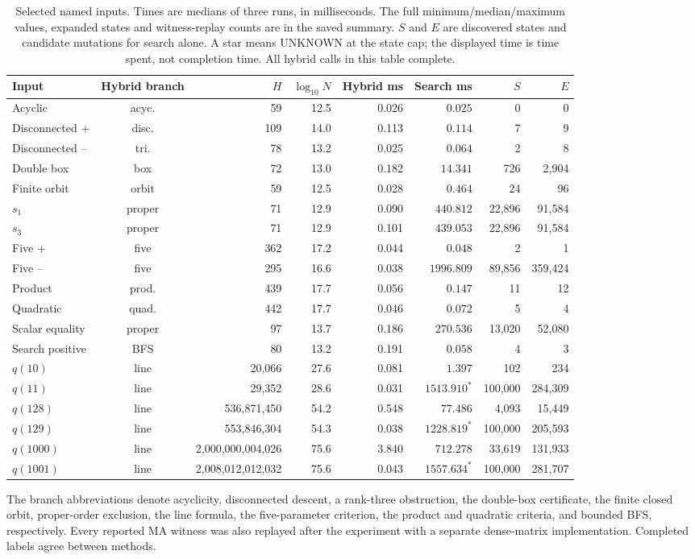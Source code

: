 \begin{table}[htbp]\centering\scriptsize
\caption{Selected named inputs. Times are medians of three runs, in milliseconds. The full minimum/median/maximum values, expanded states and witness-replay counts are in the saved summary. $S$ and $E$ are discovered states and candidate mutations for search alone. A star means UNKNOWN at the state cap; the displayed time is time spent, not completion time. All hybrid calls in this table complete.}\label{tab:named}
\begin{tabular}{@{}lcrrrrrr@{}}\toprule
Input & Hybrid branch & $H$ & $\log_{10}N$ & Hybrid ms & Search ms & $S$ & $E$\\\midrule
Acyclic & acyc. & 59 & 12.5 & 0.026 & $0.025$ & 0 & 0 \\
Disconnected + & disc. & 109 & 14.0 & 0.113 & $0.114$ & 7 & 9 \\
Disconnected -- & tri. & 78 & 13.2 & 0.025 & $0.064$ & 2 & 8 \\
Double box & box & 72 & 13.0 & 0.182 & $14.341$ & 726 & 2,904 \\
Finite orbit & orbit & 59 & 12.5 & 0.028 & $0.464$ & 24 & 96 \\
$s_1$ & proper & 71 & 12.9 & 0.090 & $440.812$ & 22,896 & 91,584 \\
$s_3$ & proper & 71 & 12.9 & 0.101 & $439.053$ & 22,896 & 91,584 \\
Five + & five & 362 & 17.2 & 0.044 & $0.048$ & 2 & 1 \\
Five -- & five & 295 & 16.6 & 0.038 & $1996.809$ & 89,856 & 359,424 \\
Product & prod. & 439 & 17.7 & 0.056 & $0.147$ & 11 & 12 \\
Quadratic & quad. & 442 & 17.7 & 0.046 & $0.072$ & 5 & 4 \\
Scalar equality & proper & 97 & 13.7 & 0.186 & $270.536$ & 13,020 & 52,080 \\
Search positive & BFS & 80 & 13.2 & 0.191 & $0.058$ & 4 & 3 \\
$q(10)$ & line & 20,066 & 27.6 & 0.081 & $1.397$ & 102 & 234 \\
$q(11)$ & line & 29,352 & 28.6 & 0.031 & $1513.910^{*}$ & 100,000 & 284,309 \\
$q(128)$ & line & 536,871,450 & 54.2 & 0.548 & $77.486$ & 4,093 & 15,449 \\
$q(129)$ & line & 553,846,304 & 54.3 & 0.038 & $1228.819^{*}$ & 100,000 & 205,593 \\
$q(1000)$ & line & 2,000,000,004,026 & 75.6 & 3.840 & $712.278$ & 33,619 & 131,933 \\
$q(1001)$ & line & 2,008,012,012,032 & 75.6 & 0.043 & $1557.634^{*}$ & 100,000 & 281,707 \\
\bottomrule\end{tabular}\end{table}
The branch abbreviations denote acyclicity, disconnected descent, a rank-three obstruction, the double-box certificate, the finite closed orbit, proper-order exclusion, the line formula, the five-parameter criterion, the product and quadratic criteria, and bounded BFS, respectively. Every reported MA witness was also replayed after the experiment with a separate dense-matrix implementation. Completed labels agree between methods.

